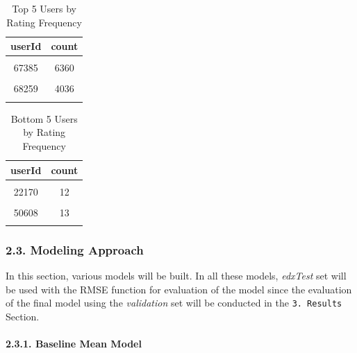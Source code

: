 \documentclass[
]{article}
\begin{document}
\begin{table}[H]

\caption{\label{tab:Table 6: Top 5 Users by Rating Frequency}Top 5 Users by Rating Frequency}
\centering
\fontsize{11}{13}\selectfont
\begin{tabular}[t]{|>{}c|||>{}c|}
\hline
userId & count\\
\hline
\cellcolor{gray!6}{59269} & \cellcolor{gray!6}{6616}\\
\hline
67385 & 6360\\
\hline
\cellcolor{gray!6}{14463} & \cellcolor{gray!6}{4648}\\
\hline
68259 & 4036\\
\hline
\cellcolor{gray!6}{27468} & \cellcolor{gray!6}{4023}\\
\hline
\end{tabular}
\end{table}

\begin{table}[H]

\caption{\label{tab:Table 7: Bottom 5 Users by Rating Frequency}Bottom 5 Users by Rating Frequency}
\centering
\fontsize{11}{13}\selectfont
\begin{tabular}[t]{|>{}c|||>{}c|}
\hline
userId & count\\
\hline
\cellcolor{gray!6}{62516} & \cellcolor{gray!6}{10}\\
\hline
22170 & 12\\
\hline
\cellcolor{gray!6}{15719} & \cellcolor{gray!6}{13}\\
\hline
50608 & 13\\
\hline
\cellcolor{gray!6}{901} & \cellcolor{gray!6}{14}\\
\hline
\end{tabular}
\end{table}

\hypertarget{modeling-approach}{%
\subsubsection{2.3. Modeling Approach}\label{modeling-approach}}

In this section, various models will be built. In all these models,
\emph{edxTest} set will be used with the RMSE function for evaluation of
the model since the evaluation of the final model using the
\emph{validation} set will be conducted in the \texttt{3.\ Results}
Section.

\hypertarget{baseline-mean-model}{%
\paragraph{2.3.1. Baseline Mean Model}\label{baseline-mean-model}}
\end{document}
